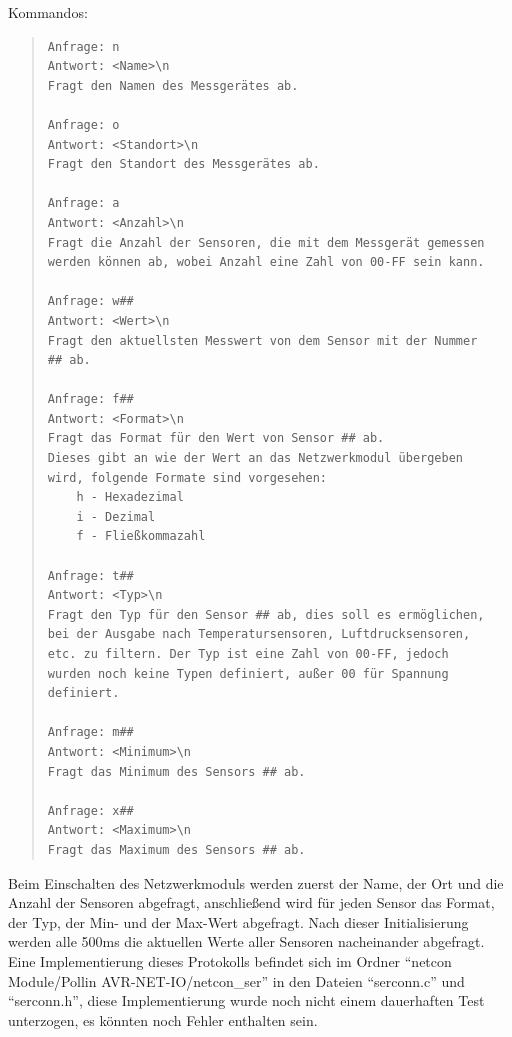 \documentclass[a4paper,14pt,headsepline]{scrartcl}
\begin{document}
Kommandos:
\begin{quote}
\begin{verbatim}
Anfrage: n
Antwort: <Name>\n
Fragt den Namen des Messgerätes ab.

Anfrage: o
Antwort: <Standort>\n
Fragt den Standort des Messgerätes ab.

Anfrage: a
Antwort: <Anzahl>\n
Fragt die Anzahl der Sensoren, die mit dem Messgerät gemessen
werden können ab, wobei Anzahl eine Zahl von 00-FF sein kann.

Anfrage: w##
Antwort: <Wert>\n
Fragt den aktuellsten Messwert von dem Sensor mit der Nummer
## ab.

Anfrage: f##
Antwort: <Format>\n
Fragt das Format für den Wert von Sensor ## ab.
Dieses gibt an wie der Wert an das Netzwerkmodul übergeben
wird, folgende Formate sind vorgesehen:
    h - Hexadezimal
    i - Dezimal
    f - Fließkommazahl
    
Anfrage: t##
Antwort: <Typ>\n
Fragt den Typ für den Sensor ## ab, dies soll es ermöglichen,
bei der Ausgabe nach Temperatursensoren, Luftdrucksensoren,
etc. zu filtern. Der Typ ist eine Zahl von 00-FF, jedoch
wurden noch keine Typen definiert, außer 00 für Spannung
definiert.

Anfrage: m##
Antwort: <Minimum>\n
Fragt das Minimum des Sensors ## ab.

Anfrage: x##
Antwort: <Maximum>\n
Fragt das Maximum des Sensors ## ab.
\end{verbatim}
\end{quote}

\newpage

Beim Einschalten des Netzwerkmoduls werden zuerst der Name, der Ort und die Anzahl der Sensoren abgefragt, anschließend wird für jeden Sensor das Format, der Typ, der Min- und der Max-Wert abgefragt. Nach dieser Initialisierung werden alle 500ms die aktuellen Werte aller Sensoren nacheinander abgefragt. Eine Implementierung dieses Protokolls befindet sich im Ordner "`netcon Module/Pollin AVR-NET-IO/netcon\_ser"' in den Dateien "`serconn.c"' und "`serconn.h"', diese Implementierung wurde noch nicht einem dauerhaften Test unterzogen, es könnten noch Fehler enthalten sein.

\newpage
\end{document}
